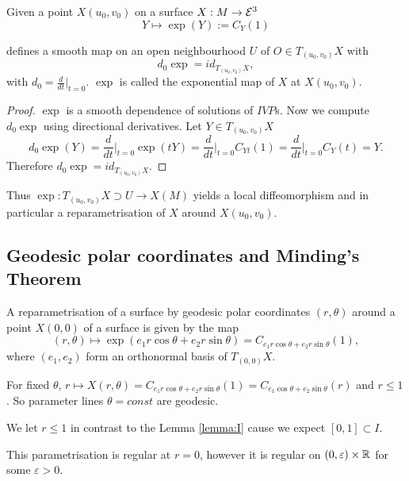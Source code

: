 \begin{lemma, definition}
	Given a point $X(u_0,v_0)$ on a surface $X:M \to \mathcal E^3$
		\[ Y \mapsto \exp(Y):= C_Y(1) \]
		
	defines a smooth map on an open neighbourhood $U$ of $O \in T_{(u_0,v_0)}X$ with 		
		\[d_0\exp = id_{T_{(u_0,v_0)}X},\]
	with $d_0= \frac d{dt} \big |_{t=0} $.
	$\exp$ is called the exponential map of $X$ at $X(u_0,v_0)$.
\end{lemma, definition}

\begin{proof}
	$\exp$ is a smooth dependence of solutions of $IVP$s. Now we compute $d_0\exp$ using directional derivatives. Let $Y \in T_{(u_0,v_0)}X$
		\[ d_0\exp(Y) 
			= \frac d{dt} \big |_{t=0} \exp(tY) 
			= \frac d{dt}\big |_{t=0} C_{Yt}(1) 
			= \frac d{dt}\big |_{t=0} C_Y(t) 
			= Y. \]
	Therefore $d_0\exp = id_{T_{(u_0,v_0)}X}$.
\end{proof}

\begin{remark}
	Thus $\exp : T_{(u_0,v_0)}X \supset U \to X(M)$ yields a local diffeomorphism and in particular a reparametrisation of $X$ around $X(u_0,v_0)$.  
\end{remark}

\subsection{Geodesic polar coordinates and Minding's Theorem}

\begin{definition}
	A reparametrisation of a surface by geodesic polar coordinates $(r,\theta)$ around a point $X(0,0)$ of a surface is given by the map
		\[ (r,\theta) \mapsto \exp(e_1 r \cos\theta + e_2 r \sin \theta)
			=C_{e_1 r \cos\theta + e_2 r \sin \theta}(1), \]
	where $(e_1,e_2)$ form an orthonormal basis of $T_{(0,0)}X$.
	
	For fixed $\theta$, $r \mapsto X(r,\theta) = C_{e_1 r \cos\theta + e_2 r \sin \theta}(1) = C_{e_1 \cos\theta + e_2 \sin \theta}(r)$ and $r \leq1$.
	So parameter lines $\theta = const$ are geodesic.
	
	We let $r \leq 1$ in contrast to the Lemma \ref{lemma:I} cause we expect $[0,1] \subset I$.
\end{definition}

\begin{remark}
	This parametrisation is regular at $r=0$, however it is regular on $(0,\varepsilon) \times \mathbb R$ for some $\varepsilon>0$.
\end{remark}

